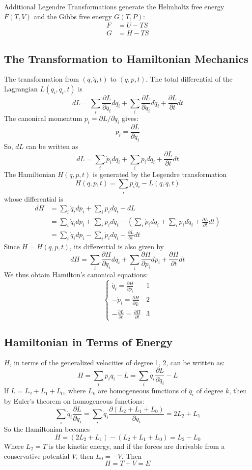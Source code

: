 \documentclass[12pt]{article}
\begin{document}
	Additional Legendre Transformations generate the Helmholtz free energy $F(T, V)$ and the Gibbs free energy $G(T, P)$:
	\begin{align*}
		F &= U - TS \\
		G &= H - TS
	\end{align*}
	
	\subsection{ The Transformation to Hamiltonian Mechanics}
	The transformation from $(q, \dot{q}, t)$ to $(q, p, t)$.
	The total differential of the Lagrangian $L(q_i, \dot{q}_i, t)$ is
	$$
	dL = \sum_i \frac{\partial L}{\partial q_i} dq_i + \sum_i \frac{\partial L}{\partial \dot{q}_i} d\dot{q}_i + \frac{\partial L}{\partial t} dt
	$$
	The canonical momentum $p_i = \partial L / \partial \dot{q}_i$ gives:
	$$
	p_i = \frac{\partial L}{\partial \dot{q}_i}
	$$
	So, $dL$ can be written as
	$$
	dL = \sum_i \dot{p}_i dq_i + \sum_i p_i d\dot{q}_i + \frac{\partial L}{\partial t} dt
	$$
	The Hamiltonian $H(q, p, t)$ is generated by the Legendre transformation
	$$
	H(q, p, t) = \sum_i p_i \dot{q}_i - L(q, \dot{q}, t)
	$$
	whose differential is
	\begin{align*}
		dH &= \sum_i \dot{q}_i dp_i + \sum_i p_i d\dot{q}_i - dL \\
		&= \sum_i \dot{q}_i dp_i + \sum_i p_i d\dot{q}_i - \left( \sum_i \dot{p}_i dq_i + \sum_i p_i d\dot{q}_i + \frac{\partial L}{\partial t} dt \right) \\
		&= \sum_i \dot{q}_i dp_i - \sum_i \dot{p}_i dq_i - \frac{\partial L}{\partial t} dt
	\end{align*}
	Since $H = H(q, p, t)$, its differential is also given by
	$$
	dH = \sum_i \frac{\partial H}{\partial q_i} dq_i + \sum_i \frac{\partial H}{\partial p_i} dp_i + \frac{\partial H}{\partial t} dt
	$$
	We thus obtain Hamilton's canonical equations:
	$$
	\begin{cases}
		\dot{q}_i = \frac{\partial H}{\partial p_i} & \text{1} \\
		-\dot{p}_i = \frac{\partial H}{\partial q_i} & \text{2} \\
		-\frac{\partial L}{\partial t} = \frac{\partial H}{\partial t} & \text{3}
	\end{cases}
	$$
	
	\subsection{ Hamiltonian in Terms of Energy}
	$H$, in terms of the generalized velocities of degree 1, 2, can be written as:
	$$
	H = \sum_i p_i \dot{q}_i - L = \sum_i \dot{q}_i \frac{\partial L}{\partial \dot{q}_i} - L
	$$
	If $L = L_2 + L_1 + L_0$, where $L_k$ are homogeneous functions of $\dot{q}_i$ of degree $k$, then by Euler's theorem on homogeneous functions:
	$$
	\sum_i \dot{q}_i \frac{\partial L}{\partial \dot{q}_i} = \sum_i \dot{q}_i \frac{\partial (L_2+L_1+L_0)}{\partial \dot{q}_i} = 2L_2 + L_1
	$$
	So the Hamiltonian becomes
	$$
	H = (2L_2 + L_1) - (L_2 + L_1 + L_0) = L_2 - L_0
	$$
	Where $L_2 = T$ is the kinetic energy, and if the forces are derivable from a conservative potential $V$, then $L_0 = -V$.
	Then
	$$
	H = T + V = E
	$$
	
\end{document}
